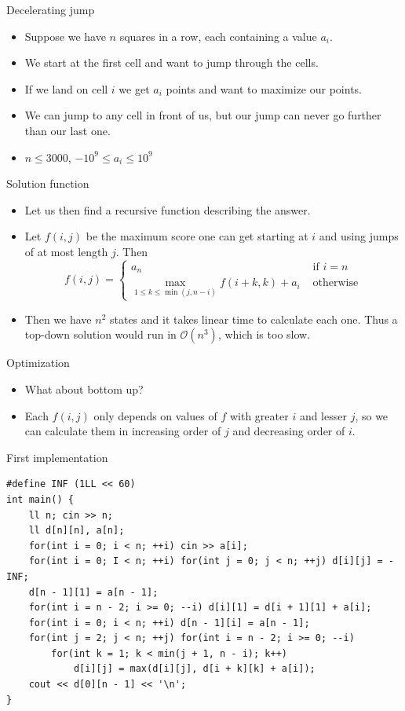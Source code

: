 \documentclass{beamer}
\begin{document}
\begin{frame}[plain]{Decelerating jump}
    \begin{itemize}
        \item Suppose we have $n$ squares in a row, each containing a value $a_i$. 
        \item We start at the first cell and want to jump through the cells.
        \item If we land on cell $i$ we get $a_i$ points and want to maximize our points.
        \item We can jump to any cell in front of us, but our jump can never go further than our last one.
        \item $n \leq 3000$, $-10^9 \leq a_i \leq 10^9$
    \end{itemize}
\end{frame}

\begin{frame}[plain]{Solution function}
    \begin{itemize}
        \item Let us then find a recursive function describing the answer. 
        \item Let $f(i, j)$ be the maximum score one can get starting at $i$ and using jumps of at most length $j$. Then
            \[f(i, j) = \begin{cases} a_n & \text{ if } i = n \\ \max\limits_{1 \leq k \leq \min(j, n - i)} f(i + k, k) + a_i & \text{ otherwise} \end{cases}\]
        \item Then we have $n^2$ states and it takes linear time to calculate each one. Thus a top-down solution would run in $\mathcal{O}(n^3)$, which is too slow.
    \end{itemize}
\end{frame}

\begin{frame}[plain]{Optimization}
    \begin{itemize}
        \item What about bottom up?
        \item Each $f(i, j)$ only depends on values of $f$ with greater $i$ and lesser $j$, so we can calculate them in increasing order of $j$ and decreasing order of $i$.
    \end{itemize}
\end{frame}

\begin{frame}{First implementation}
\scriptsize
\begin{verbatim}
#define INF (1LL << 60)
int main() {
    ll n; cin >> n;
    ll d[n][n], a[n];
    for(int i = 0; i < n; ++i) cin >> a[i];
    for(int i = 0; I < n; ++i) for(int j = 0; j < n; ++j) d[i][j] = -INF;
    d[n - 1][1] = a[n - 1];
    for(int i = n - 2; i >= 0; --i) d[i][1] = d[i + 1][1] + a[i];
    for(int i = 0; i < n; ++i) d[n - 1][i] = a[n - 1];
    for(int j = 2; j < n; ++j) for(int i = n - 2; i >= 0; --i)
        for(int k = 1; k < min(j + 1, n - i); k++) 
            d[i][j] = max(d[i][j], d[i + k][k] + a[i]);
    cout << d[0][n - 1] << '\n';
}
\end{verbatim}
\end{frame}
\end{document}
